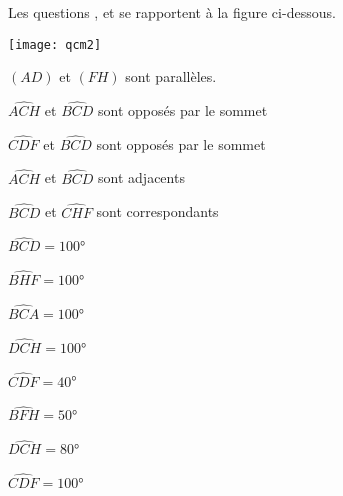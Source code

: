\begin{QCM}

\begin{EnonceCommunQCM}
Les questions ,  et  se rapportent à la figure ci-dessous.
\begin{center}
    \texttt{[image: qcm2]}
    
    $(AD)$ et $(FH)$ sont parallèles.
\end{center}
\end{EnonceCommunQCM}

\begin{GroupeQCM}

\begin{exercice}\label{Aqcm3}

\begin{ChoixQCM}{2}
\item $\widehat{ACH}$ et $\widehat{BCD}$ sont opposés par le sommet
\item $\widehat{CDF}$ et $\widehat{BCD}$ sont opposés par le sommet
\item $\widehat{ACH}$ et $\widehat{BCD}$ sont adjacents
\item $\widehat{BCD}$ et $\widehat{CHF}$ sont correspondants
\end{ChoixQCM}
\begin{corrige}
\end{corrige}
\end{exercice}




\begin{exercice}\label{Aqcm4}

\begin{ChoixQCM}{4}
\item $\widehat{BCD}=100$°
\item $\widehat{BHF}=100$°
\item $\widehat{BCA}=100$°
\item $\widehat{DCH}=100$°
\end{ChoixQCM}
\begin{corrige}
\end{corrige}
\end{exercice}




\begin{exercice}\label{Aqcm5}

\begin{ChoixQCM}{4}
\item $\widehat{CDF}=40$°
\item $\widehat{BFH}=50$°
\item $\widehat{DCH}=80$°
\item $\widehat{CDF}=100$°
\end{ChoixQCM}
\begin{corrige}
\end{corrige}
\end{exercice}




\end{GroupeQCM}
\end{QCM}
